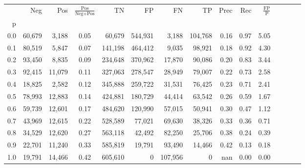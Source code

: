 \begin{tabular}{rrrcrrrrrrrrrrr}
\toprule
{} &     Neg &     Pos & $\frac{\text{Pos}}{\text{Neg}+\text{Pos}}$ &       TN &       FP &       FN &       TP &  Prec &   Rec & $\frac{\text{FP}}{\text{P}}$ \\
p   &         &         &                                            &          &          &          &          &       &       &                              \\
\midrule
0.0 &  60,679 &   3,188 &                                       0.05 &   60,679 &  544,931 &    3,188 &  104,768 &  0.16 &  0.97 &                         5.05 \\
0.1 &  80,519 &   5,847 &                                       0.07 &  141,198 &  464,412 &    9,035 &   98,921 &  0.18 &  0.92 &                         4.30 \\
0.2 &  93,450 &   8,835 &                                       0.09 &  234,648 &  370,962 &   17,870 &   90,086 &  0.20 &  0.83 &                         3.44 \\
0.3 &  92,415 &  11,079 &                                       0.11 &  327,063 &  278,547 &   28,949 &   79,007 &  0.22 &  0.73 &                         2.58 \\
0.4 &  18,825 &   2,582 &                                       0.12 &  345,888 &  259,722 &   31,531 &   76,425 &  0.23 &  0.71 &                         2.41 \\
0.5 &  78,993 &  12,883 &                                       0.14 &  424,881 &  180,729 &   44,414 &   63,542 &  0.26 &  0.59 &                         1.67 \\
0.6 &  59,739 &  12,601 &                                       0.17 &  484,620 &  120,990 &   57,015 &   50,941 &  0.30 &  0.47 &                         1.12 \\
0.7 &  43,969 &  12,615 &                                       0.22 &  528,589 &   77,021 &   69,630 &   38,326 &  0.33 &  0.36 &                         0.71 \\
0.8 &  34,529 &  12,620 &                                       0.27 &  563,118 &   42,492 &   82,250 &   25,706 &  0.38 &  0.24 &                         0.39 \\
0.9 &  22,701 &  11,240 &                                       0.33 &  585,819 &   19,791 &   93,490 &   14,466 &  0.42 &  0.13 &                         0.18 \\
1.0 &  19,791 &  14,466 &                                       0.42 &  605,610 &        0 &  107,956 &        0 &   nan &  0.00 &                         0.00 \\
\bottomrule
\end{tabular}
